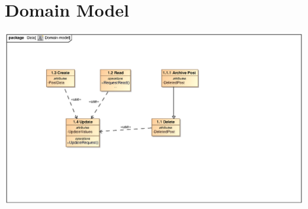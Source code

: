 \documentclass{scrreprt}
\begin{document}
\chapter{Domain Model}   								%
\includegraphics[scale=.9]{CRUDDomainModel.eps}				
\end{document}
